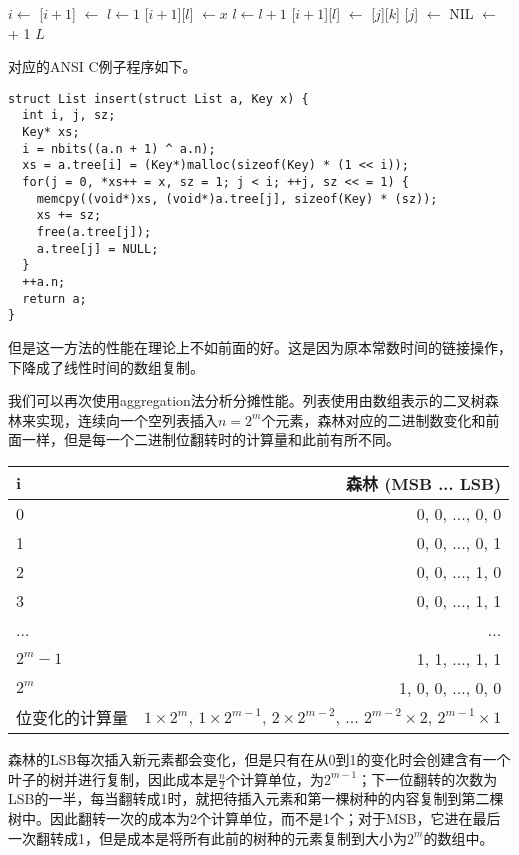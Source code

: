 \documentclass[UTF8]{article}
\begin{document}
\begin{algorithmic}
  \State $i \gets $ 
  \State {}[$i+1$] $\gets $ 
  \State $l \gets 1$
  \State  {}[$i+1$][$l$]  $\gets x$
      \State $l \gets l + 1$
      \State {}[$i+1$][$l$]  $\gets$ [$j$][$k$]
    \EndFor
    \State {}[$j$] $\gets$ NIL
  \EndFor
  \State {} $\gets$  + 1
  \State \Return $L$
\EndFunction
\end{algorithmic}

对应的ANSI C例子程序如下。

\lstset{language=C}
\begin{lstlisting}
struct List insert(struct List a, Key x) {
  int i, j, sz;
  Key* xs;
  i = nbits((a.n + 1) ^ a.n);
  xs = a.tree[i] = (Key*)malloc(sizeof(Key) * (1 << i));
  for(j = 0, *xs++ = x, sz = 1; j < i; ++j, sz << = 1) {
    memcpy((void*)xs, (void*)a.tree[j], sizeof(Key) * (sz));
    xs += sz;
    free(a.tree[j]);
    a.tree[j] = NULL;
  }
  ++a.n;
  return a;
}
\end{lstlisting}

但是这一方法的性能在理论上不如前面的好。这是因为原本常数时间的链接操作，下降成了线性时间的数组复制。

我们可以再次使用aggregation法分析分摊性能。列表使用由数组表示的二叉树森林来实现，连续向一个空列表插入$n = 2^m$个元素，森林对应的二进制数变化和前面一样，但是每一个二进制位翻转时的计算量和此前有所不同。

\begin{tabular}{l | r}
  \hline
  i & 森林 (MSB ... LSB) \\
  \hline
  0 & 0, 0, ..., 0, 0 \\
  1 & 0, 0, ..., 0, 1 \\
  2 & 0, 0, ..., 1, 0 \\
  3 & 0, 0, ..., 1, 1 \\
  ... & ... \\
  $2^m-1$ & 1, 1, ..., 1, 1 \\
  $2^m$ & 1, 0, 0, ..., 0, 0 \\
  \hline
  位变化的计算量 & $1 \times 2^m$, $1 \times 2^{m-1}$, $2 \times 2^{m-2}$, ... $2^{m-2} \times 2$, $2^{m-1} \times 1$ \\
  \hline
\end{tabular}

森林的LSB每次插入新元素都会变化，但是只有在从0到1的变化时会创建含有一个叶子的树并进行复制，因此成本是$\frac{n}{2}$个计算单位，为$2^{m-1}$；下一位翻转的次数为LSB的一半，每当翻转成1时，就把待插入元素和第一棵树种的内容复制到第二棵树中。因此翻转一次的成本为2个计算单位，而不是1个；对于MSB，它进在最后一次翻转成1，但是成本是将所有此前的树种的元素复制到大小为$2^m$的数组中。
\end{document}
